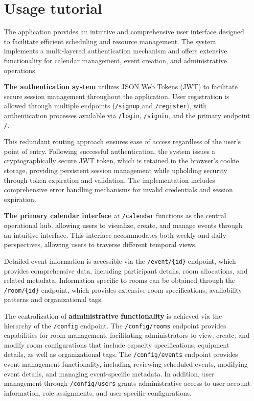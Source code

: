 \newpage
\section{Usage tutorial}\label{sec:usageTutorial}
The application provides an intuitive and comprehensive user interface designed to facilitate efficient scheduling and resource management.
The system implements a multi-layered authentication mechanism and offers extensive functionality for calendar management, event creation, and administrative operations.

\textbf{The authentication system} utilizes JSON Web Tokens (JWT) to facilitate secure session management throughout the application.
User registration is allowed through multiple endpoints (\texttt{/signup} and \texttt{/register}), with authentication processes available via \texttt{/login}, \texttt{/signin}, and the primary endpoint \texttt{/}.

This redundant routing approach ensures ease of access regardless of the user's point of entry.
Following successful authentication, the system issues a cryptographically secure JWT token, which is retained in the browser's cookie storage, providing persistent session management while upholding security through token expiration and validation.
The implementation includes comprehensive error handling mechanisms for invalid credentials and session expiration.

\textbf{The primary calendar interface} at \texttt{/calendar} functions as the central operational hub, allowing users to visualize, create, and manage events through an intuitive interface.
This interface accommodates both weekly and daily perspectives, allowing users to traverse different temporal views.

Detailed event information is accessible via the \texttt{/event/\{id\}} endpoint, which provides comprehensive data, including participant details, room allocations, and related metadata.
Information specific to rooms can be obtained through the \texttt{/room/\{id\}} endpoint, which provides extensive room specifications, availability patterns and organizational tags.

The centralization of \textbf{administrative functionality} is achieved via the hierarchy of the \texttt{/config} endpoint.
The \texttt{/config/rooms} endpoint provides capabilities for room management, facilitating administrators to view, create, and modify room configurations that include capacity specifications, equipment details, as well as organizational tags.
The \texttt{/config/events} endpoint provides event management functionality, including reviewing scheduled events, modifying event details, and managing event-specific metadata.
In addition, user management through \texttt{/config/users} grants administrative access to user account information, role assignments, and user-specific configurations.

